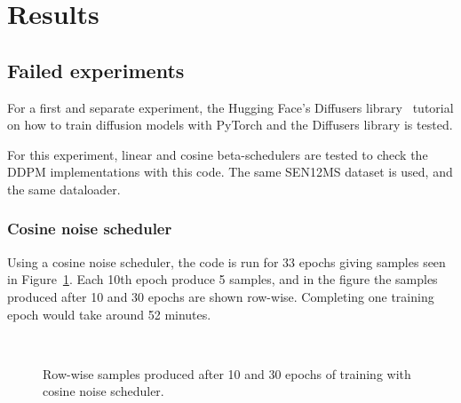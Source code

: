 \documentclass[fullpaper]{nldl}
\begin{document}
\section{Results}
\label{sect:Results}
\subsection{Failed experiments}
\label{subsect:Res-Failed}
For a first and separate experiment, the Hugging Face's Diffusers library~\cite{von-platen-etal-2022-diffusers} tutorial on how to train diffusion models with PyTorch and the Diffusers library is tested.

For this experiment, linear and cosine beta-schedulers are tested to check the DDPM implementations with this code. The same SEN12MS dataset is used, and the same dataloader.


\subsubsection{Cosine noise scheduler}
\label{subsubsect:Res-cosine_fail} 
Using a cosine noise scheduler, the code is run for 33 epochs giving samples seen in Figure~\ref{fig:Failed-cosine}. Each 10th epoch produce 5 samples, and in the figure the samples produced after 10 and 30 epochs are shown row-wise. Completing one training epoch would take around 52 minutes.
\begin{figure}[h!]
	\centering
	\\
	\caption{Row-wise samples produced after 10 and 30 epochs of training with cosine noise scheduler. \label{fig:Failed-cosine}}
\end{figure}
\end{document}
